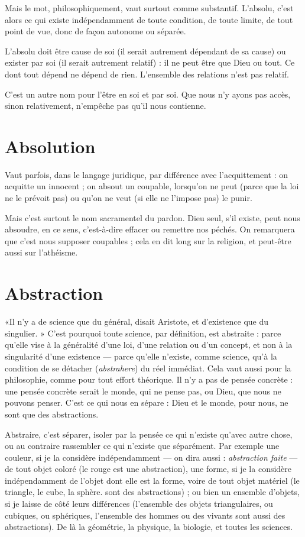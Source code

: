 Mais le mot, philosophiquement, vaut surtout comme substantif. L’absolu,
c'est alors ce qui existe indépendamment de toute condition, de toute limite,
de tout point de vue, donc de façon autonome ou séparée.

L’absolu doit être cause de soi (il serait autrement dépendant de sa cause) ou
exister par soi (il serait autrement relatif) : il ne peut être que Dieu ou tout. Ce
dont tout dépend ne dépend de rien. L'ensemble des relations n’est pas relatif.

C’est un autre nom pour l'être en soi et par soi. Que nous n’y ayons pas
accès, sinon relativement, n’empêche pas qu’il nous contienne.

\section{Absolution}
Vaut parfois, dans le langage juridique, par différence avec
l’acquittement : on acquitte un innocent ; on absout un
coupable, lorsqu'on ne peut (parce que la loi ne le prévoit pas) ou qu'on ne
veut (si elle ne l’impose pas) le punir.

Mais c’est surtout le nom sacramentel du pardon. Dieu seul, s’il existe, peut
nous absoudre, en ce sens, c’est-à-dire effacer ou remettre nos péchés. On
remarquera que c’est nous supposer coupables ; cela en dit long sur la religion,
et peut-être aussi sur l’athéisme.

\section{Abstraction}
«Il n’y a de science que du général, disait Aristote, et d’existence
que du singulier. » C’est pourquoi toute science, par
définition, est abstraite : parce qu’elle vise à la généralité d’une loi, d’une relation
ou d’un concept, et non à la singularité d’une existence — parce qu’elle
n'existe, comme science, qu’à la condition de se détacher ({\it abstrahere}) du réel
immédiat. Cela vaut aussi pour la philosophie, comme pour tout effort théorique.
Il n’y a pas de pensée concrète : une pensée concrète serait le monde, qui
ne pense pas, ou Dieu, que nous ne pouvons penser. C’est ce qui nous en
sépare : Dieu et le monde, pour nous, ne sont que des abstractions.

Abstraire, c’est séparer, isoler par la pensée ce qui n’existe qu'avec autre
chose, ou au contraire rassembler ce qui n'existe que séparément. Par exemple
une couleur, si je la considère indépendamment — on dira aussi : {\it abstraction
faite} — de tout objet coloré (le rouge est une abstraction), une forme, si je la
considère indépendamment de l’objet dont elle est la forme, voire de tout objet
matériel (le triangle, le cube, la sphère. sont des abstractions) ; ou bien un
ensemble d’objets, si je laisse de côté leurs différences (l’ensemble des objets
triangulaires, ou cubiques, ou sphériques, l'ensemble des hommes ou des
vivants sont aussi des abstractions). De là la géométrie, la physique, la biologie,
et toutes les sciences.

